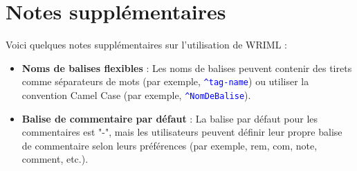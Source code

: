 \documentclass{article}
\newcommand{\wriml}[1]{\textcolor{blue}{\texttt{#1}}}
\begin{document}
\section{Notes supplémentaires}
Voici quelques notes supplémentaires sur l'utilisation de WRIML :

\begin{itemize}
    \item \textbf{Noms de balises flexibles} : Les noms de balises peuvent contenir des tirets comme séparateurs de mots (par exemple, \wriml{\textasciicircum tag-name}) ou utiliser la convention Camel Case (par exemple, \wriml{\textasciicircum NomDeBalise}).
    \item \textbf{Balise de commentaire par défaut} : La balise par défaut pour les commentaires est "-", mais les utilisateurs peuvent définir leur propre balise de commentaire selon leurs préférences (par exemple, rem, com, note, comment, etc.).
\end{itemize}
\end{document}

